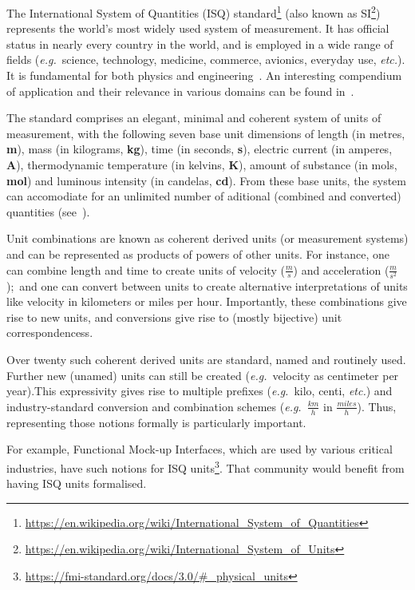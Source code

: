 \documentclass[runningheads,a4paper]{llncs}
\begin{document}
The International System of Quantities (ISQ) standard\footnote{\url{https://en.wikipedia.org/wiki/International_System_of_Quantities}} (also known as SI\footnote{\url{https://en.wikipedia.org/wiki/International_System_of_Units}}) represents the world's most widely used system of measurement. It has official status in nearly every country in the world, and is employed in a wide range of fields (\textit{e.g.}~science, technology, medicine, commerce, avionics, everyday use, \textit{etc.}). It is fundamental for both physics and engineering~\cite{bipm-jcgm:2012:VIM}. An interesting compendium of application and their relevance in various domains can be found in~\cite{NPL-book}. 

The standard comprises an elegant, minimal and coherent system of units of measurement, with the following seven base unit dimensions of length (in metres, \textbf{m}), mass (in kilograms, \textbf{kg}), time (in seconds, \textbf{s}), electric current (in amperes, \textbf{A}), thermodynamic temperature (in kelvins, \textbf{K}), amount of substance (in mols, \textbf{mol}) and luminous intensity (in candelas, \textbf{cd}). From these base units, the system can accomodiate for an unlimited number of aditional (combined and converted) quantities (see~). 

Unit combinations are known as coherent derived units (or measurement systems) and can be represented as products of powers of other units. For instance, one can combine length and time to create units of velocity (\(\frac{m}{s}\)) and acceleration (\(\frac{m}{s^2}\));~and one can convert between units to create alternative interpretations of units like velocity in kilometers or miles per hour. Importantly, these combinations give rise to new units, and conversions give rise to (mostly bijective) unit correspondencess. 

Over twenty such coherent derived units are standard, named and routinely used. Further new (unamed) units can still be created (\textit{e.g.}~velocity as centimeter per year).This expressivity gives rise to multiple prefixes (\textit{e.g.}~kilo, centi, \textit{etc.}) and industry-standard conversion and combination schemes (\textit{e.g.}~\(\frac{km}{h}\) in \(\frac{miles}{h}\)). Thus, representing those notions formally is particularly important. 

For example, Functional Mock-up Interfaces, which are used by various critical industries, have such notions for ISQ units\footnote{\url{https://fmi-standard.org/docs/3.0/\#_physical_units}}. That community would benefit from having ISQ units formalised.         
\end{document}
